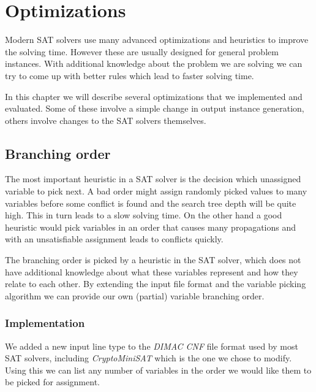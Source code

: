 \chapter{Optimizations}

Modern SAT solvers use many advanced optimizations and heuristics to improve the solving time.
However these are usually designed for general problem instances.
With additional knowledge about the problem we are solving we can try to come up with better rules which lead to faster solving time.

In this chapter we will describe several optimizations that we implemented and evaluated.
Some of these involve a simple change in output instance generation, others involve changes to the SAT solvers themselves.


\section{Branching order}


The most important heuristic in a SAT solver is the decision which unassigned variable to pick next.
A bad order might assign randomly picked values to many variables before some conflict is found and the search tree depth will be quite high.
This in turn leads to a slow solving time.
On the other hand a good heuristic would pick variables in an order that causes many propagations and with an unsatisfiable assignment leads to conflicts quickly.

The branching order is picked by a heuristic in the SAT solver, which does not have additional knowledge about what these variables represent and how they relate to each other.
By extending the input file format and the variable picking algorithm we can provide our own (partial) variable branching order.

\subsection{Implementation}

We added a new input line type to the \emph{DIMAC CNF} file format used by most SAT solvers, including \emph{CryptoMiniSAT} which is the one we chose to modify.
Using this we can list any number of variables in the order we would like them to be picked for assignment.

